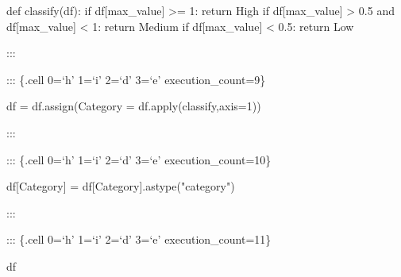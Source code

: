 \documentclass[
  letterpaper,
  DIV=11,
  numbers=noendperiod]{scrartcl}
\newenvironment{Shaded}{\begin{snugshade}}{\end{snugshade}}
\newcommand{\BuiltInTok}[1]{\textcolor[rgb]{0.00,0.23,0.31}{#1}}
\newcommand{\ControlFlowTok}[1]{\textcolor[rgb]{0.00,0.23,0.31}{#1}}
\newcommand{\DecValTok}[1]{\textcolor[rgb]{0.68,0.00,0.00}{#1}}
\newcommand{\FloatTok}[1]{\textcolor[rgb]{0.68,0.00,0.00}{#1}}
\newcommand{\KeywordTok}[1]{\textcolor[rgb]{0.00,0.23,0.31}{#1}}
\newcommand{\NormalTok}[1]{\textcolor[rgb]{0.00,0.23,0.31}{#1}}
\newcommand{\OperatorTok}[1]{\textcolor[rgb]{0.37,0.37,0.37}{#1}}
\newcommand{\StringTok}[1]{\textcolor[rgb]{0.13,0.47,0.30}{#1}}
\begin{document}
\begin{Shaded}
\begin{Highlighting}[]
\KeywordTok{def}\NormalTok{ classify(df):}
    \ControlFlowTok{if}\NormalTok{ df[}\StringTok{\textquotesingle{}max\_value\textquotesingle{}}\NormalTok{] }\OperatorTok{\textgreater{}=} \DecValTok{1}\NormalTok{:}
        \ControlFlowTok{return} \StringTok{\textquotesingle{}High\textquotesingle{}}
    \ControlFlowTok{if}\NormalTok{ df[}\StringTok{\textquotesingle{}max\_value\textquotesingle{}}\NormalTok{] }\OperatorTok{\textgreater{}} \FloatTok{0.5} \KeywordTok{and}\NormalTok{ df[}\StringTok{\textquotesingle{}max\_value\textquotesingle{}}\NormalTok{] }\OperatorTok{\textless{}} \DecValTok{1}\NormalTok{:}
        \ControlFlowTok{return} \StringTok{\textquotesingle{}Medium\textquotesingle{}}
    \ControlFlowTok{if}\NormalTok{ df[}\StringTok{\textquotesingle{}max\_value\textquotesingle{}}\NormalTok{] }\OperatorTok{\textless{}} \FloatTok{0.5}\NormalTok{:}
        \ControlFlowTok{return} \StringTok{\textquotesingle{}Low\textquotesingle{}}
\end{Highlighting}
\end{Shaded}

:::

::: \{.cell 0=`h' 1=`i' 2=`d' 3=`e' execution\_count=9\}

\begin{Shaded}
\begin{Highlighting}[]
\NormalTok{df }\OperatorTok{=}\NormalTok{ df.assign(Category }\OperatorTok{=}\NormalTok{ df.}\BuiltInTok{apply}\NormalTok{(classify,axis}\OperatorTok{=}\DecValTok{1}\NormalTok{))}
\end{Highlighting}
\end{Shaded}

:::

::: \{.cell 0=`h' 1=`i' 2=`d' 3=`e' execution\_count=10\}

\begin{Shaded}
\begin{Highlighting}[]
\NormalTok{df[}\StringTok{\textquotesingle{}Category\textquotesingle{}}\NormalTok{] }\OperatorTok{=}\NormalTok{ df[}\StringTok{\textquotesingle{}Category\textquotesingle{}}\NormalTok{].astype(}\StringTok{"category"}\NormalTok{)}
\end{Highlighting}
\end{Shaded}

:::

::: \{.cell 0=`h' 1=`i' 2=`d' 3=`e' execution\_count=11\}

\begin{Shaded}
\begin{Highlighting}[]
\NormalTok{df}
\end{Highlighting}
\end{Shaded}
\end{document}
